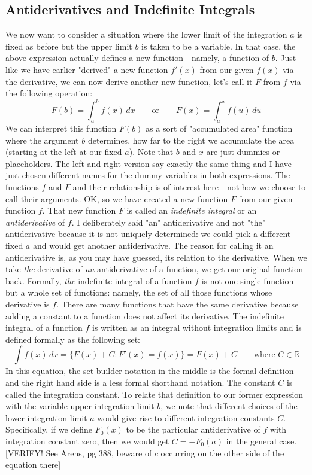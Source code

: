 \subsection{Antiderivatives and Indefinite Integrals}
We now want to consider a situation where the lower limit of the integration $a$ is fixed as before but the upper limit $b$ is taken to be a variable. In that case, the above expression actually defines a new function - namely, a function of $b$. Just like we have earlier "derived" a new function $f'(x)$ from our given $f(x)$ via the derivative, we can now derive another new function, let's call it $F$ from $f$ via the following operation:
\begin{equation}
F(b) = \int_a^b f(x) \, dx \qquad \text{or} \qquad
F(x) = \int_a^x f(u) \, du
\end{equation}
We can interpret this function $F(b)$ as a sort of "accumulated area" function where the argument $b$ determines, how far to the right we accumulate the area (starting at the left at our fixed $a$). Note that $b$ and $x$ are just dummies or placeholders. The left and right version say exactly the same thing and I have just chosen different names for the dummy variables in both expressions. The functions $f$ and $F$ and their relationship is of interest here - not how we choose to call their arguments. OK, so we have created a new function $F$ from our given function $f$. That new function $F$ is called an \emph{indefinite integral} or an \emph{antiderivative} of $f$. I deliberately said "an" antiderivative and not "the" antiderivative because it is not uniquely determined: we could pick a different fixed $a$ and would get another antiderivative. 
The reason for calling it an antiderivative is, as you may have guessed, its relation to the derivative. When we take \emph{the} derivative of \emph{an} antiderivative of a function, we get our original function back. Formally, \emph{the} indefinite integral of a function $f$ is not one single function but a whole set of functions: namely, the set of all those functions whose derivative is $f$. There are many functions that have the same derivative because adding a constant to a function does not affect its derivative. The indefinite integral of a function $f$ is written as an integral without integration limits and is defined formally as the following set:
\begin{equation}
 \int f(x) \, dx = 	\{ F(x) + C : F'(x) = f(x) \} = F(x) + C \qquad \text{where } C \in \mathbb{R}
\end{equation}
In this equation, the set builder notation in the middle is the formal definition and the right hand side is a less formal shorthand notation. The constant $C$ is called the integration constant. To relate that definition to our former expression with the variable upper integration limit $b$, we note that different choices of the lower integration limit $a$ would give rise to different integration constants $C$. Specifically, if we define $F_0(x)$ to be the particular antiderivative of $f$ with integration constant zero, then we would get $C = -F_0(a)$ in the general case. [VERIFY! See Arens, pg 388, beware of $c$ occurring on the other side of the equation there]


